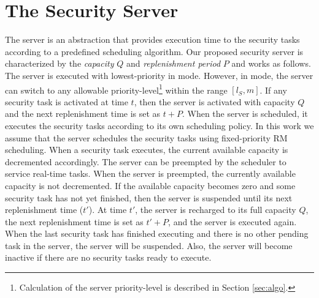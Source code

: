 \documentclass[../rt_server_main.tex]{subfiles}
\begin{document}
\section{The Security Server} \label{sec:sec_server}


%

The server \cite{server_ab_uk} is an abstraction that provides execution time to the
security tasks according to a predefined scheduling algorithm.  Our proposed security server is characterized by the
\textit{capacity} $Q$ and \textit{replenishment period} $P$ and works as
follows. %
The server is executed with lowest-priority in \pve mode. However, in 
\ave mode, the server can switch to any allowable priority-level\footnote{Calculation of the server priority-level is described in Section \ref{sec:algo}.} within the range $[l_S, m]$. If any security
task is activated at time $t$, %
then the server
is activated with capacity $Q$ and the next
replenishment time is set as $t + P$.  %
When the server is
 scheduled, it executes the security tasks according to its own scheduling
policy. In this work we assume that the server schedules the security tasks using fixed-priority RM scheduling. When a
security task executes, the current available capacity is decremented
accordingly. The server can be preempted by the scheduler to service 
real-time tasks. When the server is preempted, the currently available capacity
is not decremented. If the available capacity becomes zero and some
security task has not yet finished, then the server is suspended until its next
replenishment time ($t'$). At time $t'$, the
server is recharged to its full capacity $Q$, the next replenishment time is
set as $t' + P$, and the server is executed again. When the last security task
has finished executing and there is no other pending task in the server, the
server will be suspended. Also, the server will become inactive if there are no
security tasks ready to execute. 

\end{document}
